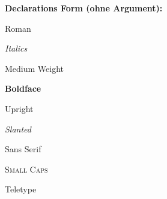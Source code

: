 \documentclass[a5paper]{article}
\begin{document}
\textbf{Declarations Form (ohne Argument):}

\begin{example}
{\rmfamily Roman}
\end{example}

\begin{example}
{\itshape Italics}
\end{example}

\begin{example}
{\mdseries Medium Weight}
\end{example}

\begin{example}
{\bfseries Boldface}
\end{example}

\begin{example}
{\upshape Upright}
\end{example}


\begin{example}
{\slshape Slanted}
\end{example}

\begin{example}
{\sffamily Sans Serif}
\end{example}


\begin{example}
{\scshape Small Caps}
\end{example}

\begin{example}
{\ttfamily Teletype}
\end{example}
\end{document}
